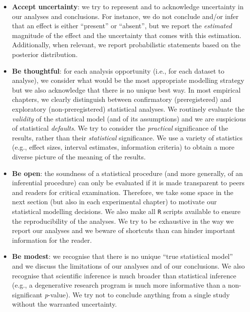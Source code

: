 \documentclass[a4paper,12pt,twoside,openright,oldfontcommands]{memoir}
\begin{document}
\begin{itemize}
\item
  \textbf{Accept uncertainty}: we try to represent and to acknowledge
  uncertainty in our analyses and conclusions. For instance, we do not
  conclude and/or infer that an effect is either ``present'' or
  ``absent'', but we report the \emph{estimated} magnitude of the effect
  and the uncertainty that comes with this estimation. Additionally,
  when relevant, we report probabilistic statements based on the
  posterior distribution.
\item
  \textbf{Be thoughtful}: for each analysis opportunity (i.e., for each
  dataset to analyse), we consider what would be the most appropriate
  modelling strategy but we also acknowledge that there is no unique
  best way. In most empirical chapters, we clearly distinguish between
  confirmatory (preregistered) and exploratory (non-preregistered)
  statistical analyses. We routinely evaluate the \emph{validity} of the
  statistical model (and of its assumptions) and we are suspicious of
  statistical \emph{defaults}. We try to consider the \emph{practical}
  significance of the results, rather than their \emph{statistical}
  significance. We use a variety of statistics (e.g., effect sizes,
  interval estimates, information criteria) to obtain a more diverse
  picture of the meaning of the results.
\item
  \textbf{Be open}: the soundness of a statistical procedure (and more
  generally, of an inferential procedure) can only be evaluated if it is
  made transparent to peers and readers for critical examination.
  Therefore, we take some space in the next section (but also in each
  experimental chapter) to motivate our statistical modelling decisions.
  We also make all \texttt{R} scripts available to ensure the
  reproducibility of the analyses. We try to be exhaustive in the way we
  report our analyses and we beware of shortcuts than can hinder
  important information for the reader.
\item
  \textbf{Be modest}: we recognise that there is no unique ``true
  statistical model'' and we discuss the limitations of our analyses and
  of our conclusions. We also recognise that scientific inference is
  much broader than statistical inference (e.g., a degenerative research
  program is much more informative than a non-significant
  \emph{p}-value). We try not to conclude anything from a single study
  without the warranted uncertainty.
\end{itemize}
\end{document}
